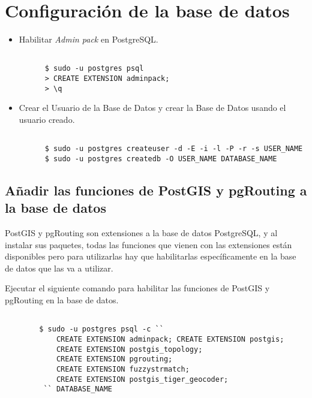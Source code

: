 \section{Configuración de la base de datos}


\begin{itemize}
  \item Habilitar \emph{Admin pack} en PostgreSQL.
  \begin{center}
    \begin{lstlisting}[label=adminpack,caption=Habilitar Admin Pack.]

      $ sudo -u postgres psql
      > CREATE EXTENSION adminpack;
      > \q
    \end{lstlisting}
  \end{center}

  \item Crear el Usuario de la Base de Datos y crear la Base de Datos usando el usuario creado.
  \begin{center}
    \begin{lstlisting}[label=adminpack,caption=Comandos para crear el usuario y la base de datos.]

      $ sudo -u postgres createuser -d -E -i -l -P -r -s USER_NAME
      $ sudo -u postgres createdb -O USER_NAME DATABASE_NAME
    \end{lstlisting}
  \end{center}


\end{itemize}


\subsection{Añadir las funciones de PostGIS y pgRouting a la base de datos}


PostGIS y pgRouting son extensiones a la base de datos PostgreSQL, y al instalar sus paquetes, todas las funciones que vienen con las extensiones están disponibles pero para utilizarlas hay que habilitarlas específicamente en la base de datos que las va a utilizar.


Ejecutar el siguiente comando para habilitar las funciones de PostGIS y pgRouting en la base de datos.

\begin{center}
  \begin{lstlisting}[label=enable_extensions,caption=Habilitación de las Extensiones.]

        $ sudo -u postgres psql -c ``
            CREATE EXTENSION adminpack; CREATE EXTENSION postgis;
            CREATE EXTENSION postgis_topology;
            CREATE EXTENSION pgrouting;
            CREATE EXTENSION fuzzystrmatch;
            CREATE EXTENSION postgis_tiger_geocoder;
         `` DATABASE_NAME
  \end{lstlisting}
\end{center}


